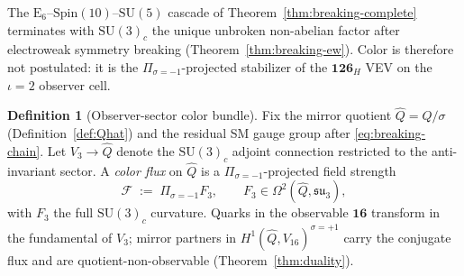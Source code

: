 \documentclass[11pt]{article}
\theoremstyle{plain}
\theoremstyle{definition}
\newtheorem{definition}[theorem]{Definition}
\theoremstyle{remark}
\numberwithin{equation}{section}
\newcommand{\E}[1]{\mathrm{E}_{#1}}
\newcommand{\Spin}{\mathrm{Spin}}
\begin{document}
The $\E{6}$--$\Spin(10)$--$\mathrm{SU}(5)$ cascade of
Theorem~\ref{thm:breaking-complete} terminates with $\mathrm{SU}(3)_c$ the
unique unbroken non-abelian factor after electroweak symmetry breaking
(Theorem~\ref{thm:breaking-ew}). Color is therefore not postulated: it is the
$\Pi_{\sigma=-1}$-projected stabilizer of the $\mathbf{126}_H$ VEV on the
$\iota=2$ observer cell.

\begin{definition}[Observer-sector color bundle]\label{def:color-bundle}
Fix the mirror quotient $\hat Q=Q/\sigma$ (Definition~\ref{def:Qhat}) and
the residual SM gauge group after \eqref{eq:breaking-chain}. Let
$V_3\to\hat Q$ denote the $\mathrm{SU}(3)_c$ adjoint connection restricted to
the anti-invariant sector. A \emph{color flux} on $\hat Q$ is a
$\Pi_{\sigma=-1}$-projected field strength
\begin{equation}\label{eq:color-flux}
  \mathcal{F}
  \;:=\;
  \Pi_{\sigma=-1} F_3,
  \qquad
  F_3 \in \Omega^2(\hat Q, \mathfrak{su}_3),
\end{equation}
with $F_3$ the full $\mathrm{SU}(3)_c$ curvature. Quarks in the observable
$\mathbf{16}$ transform in the fundamental of $V_3$; mirror partners in
$H^1(\hat Q,V_{16})^{\sigma=+1}$ carry the conjugate flux and are
quotient-non-observable (Theorem~\ref{thm:duality}).
\end{definition}
\end{document}
